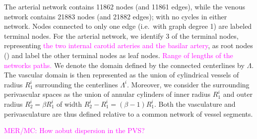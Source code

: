 \documentclass[fleqn,10pt]{wlscirep}
\newcommand{\mer}[1]{\textcolor{magenta}{#1}}
\begin{document}

The arterial network contains 11862 nodes (and 11861 edges), while the
venous network contains 21883 nodes (and 21882 edges); with no cycles
in either network. Nodes connected to only one edge (i.e.~with graph
degree 1) are labeled terminal nodes. For the arterial network, we
identify 3 of the terminal nodes, representing \mer{the two internal
  carotid arteries and the basilar artery}, as root nodes
() and label the other terminal nodes as leaf
nodes. \mer{Range of lengths of the networks paths.} We denote the
domain defined by the connected centerlines by $\Lambda$. The vascular
domain is then represented as the union of cylindrical vessels of
radius $R_1^i$ surrounding the centerlines $\Lambda^i$. Moreover, we
consider the surrounding perivascular spaces as the union of annular
cylinders of inner radius $R_1^i$ and outer radius $R_2^i = \beta
R_1^i$ of width $R_2^i - R_1^i = (\beta - 1) R_1^i$. Both the
vasculature and perivasculature are thus defined relative to a common
network of vessel segments.

\mer{MER/MC: How aobut dispersion in the PVS?}
\end{document}
